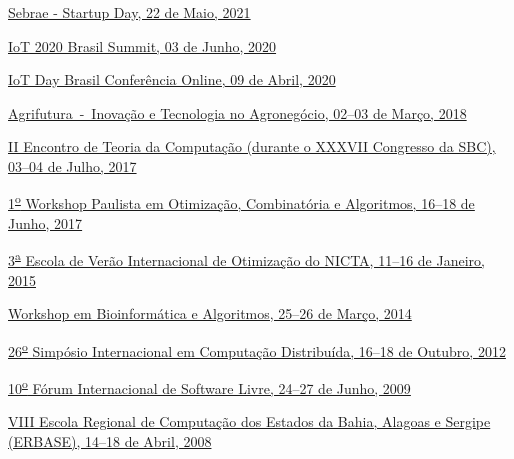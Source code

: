\documentclass[10pt]{article}
\begin{document}
\begin{innerlist}
\item \href{https://sebrae.com.br/startupday}{Sebrae - Startup Day, 22 de Maio, 2021}
  
\item \href{https://telecomwebinar.com/iot-brasil-summit-2020/}{IoT 2020 Brasil Summit, 03 de Junho, 2020}
  
\item \href{https://iotday.org/2020/iot-day-brasil-online-conference}{IoT Day Brasil Conferência Online, 09 de Abril, 2020}
  
    \item \hypertarget{evento:agrifutura2018}{\href{https://www.hackathon.com/event/agrifutura-2018---inovacao-e-tecnologia-no-agronegocio-42435741445}{Agrifutura~-~Inovação e Tecnologia no Agronegócio, 02--03 de Março, 2018}}
      
    \item \href{http://csbc2017.mackenzie.br/eventos/2-etc}{II Encontro de Teoria da Computação (durante o XXXVII Congresso da SBC), 03--04 de Julho, 2017}
  
    \item \href{https://www.ic.unicamp.br/~ra134042/wopoca2017/}{1\textsuperscript{\underline{o}} Workshop Paulista em Otimização, Combinatória e Algoritmos, 16--18 de Junho, 2017}
  
    \item \href{http://org.nicta.com.au/study-with-us/nicta-optimisation-summer-school-2015/}{3\textsuperscript{\underline{a}} Escola de Verão Internacional de Otimização do NICTA, 11--16 de Janeiro, 2015}

	\item \href{http://www.ime.usp.br/~afreire/WBA2014.html}{Workshop em Bioinformática e Algoritmos, 25--26 de Março, 2014}

    \item \href{http://www.lasid.ufba.br/disc2012/view/index.php}{26\textsuperscript{\underline{o}} Simpósio Internacional em Computação Distribuída, 16--18 de Outubro, 2012}

    \item \href{http://softwarelivre.org/fisl}{10\textsuperscript{\underline{o}} Fórum Internacional de Software Livre, 24--27 de Junho, 2009}
    
    \item \href{http://www.erbase2008.ufba.br}{VIII Escola Regional de Computação dos Estados da Bahia, Alagoas e Sergipe (ERBASE), 14--18 de Abril, 2008}


\end{innerlist}
\end{document}
